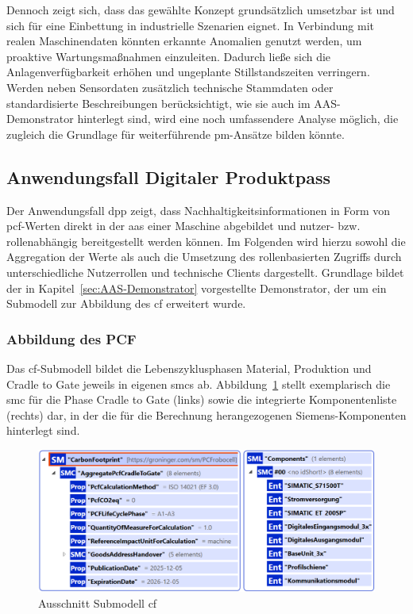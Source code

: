 Dennoch zeigt sich, dass das gewählte Konzept grundsätzlich umsetzbar ist und sich für eine Einbettung in industrielle Szenarien eignet. 
In Verbindung mit realen Maschinendaten könnten erkannte Anomalien genutzt werden, um proaktive Wartungsmaßnahmen einzuleiten. 
Dadurch ließe sich die Anlagenverfügbarkeit erhöhen und ungeplante Stillstandszeiten verringern.
Werden neben Sensordaten zusätzlich technische Stammdaten oder standardisierte Beschreibungen berücksichtigt, wie sie auch im AAS-Demonstrator hinterlegt sind, wird eine noch umfassendere Analyse möglich, die zugleich die Grundlage für weiterführende \acs{pm}-Ansätze bilden könnte.

\newpage
\subsection{Anwendungsfall Digitaler Produktpass}

Der Anwendungsfall \acs{dpp} zeigt, dass Nachhaltigkeitsinformationen in Form von \acs{pcf}-Werten direkt in der \acs{aas} einer Maschine abgebildet und nutzer- bzw. rollenabhängig bereitgestellt werden können.
Im Folgenden wird hierzu sowohl die Aggregation der Werte als auch die Umsetzung des rollenbasierten Zugriffs durch unterschiedliche Nutzerrollen und technische Clients dargestellt.
Grundlage bildet der in Kapitel~\ref{sec:AAS-Demonstrator} vorgestellte Demonstrator, der um ein Submodell zur Abbildung des \acs{cf} erweitert wurde.

\subsubsection{Abbildung des PCF}
Das \acs{cf}-Submodell bildet die Lebenszyklusphasen Material, Produktion und Cradle to Gate jeweils in eigenen \acsp{smc} ab.
Abbildung~\ref{fig:SubmodellCF} stellt exemplarisch die \acs{smc} für die Phase Cradle to Gate (links) sowie die integrierte Komponentenliste (rechts) dar, in der die für die Berechnung herangezogenen Siemens-Komponenten hinterlegt sind.

\vspace{0.5em}
\begin{figure}[htbp]
    \centering
        \includegraphics[width=1\textwidth]{Bilder/ErgebnissePackageExplorer/CarbonFoorprintTest.png}
    \caption{Ausschnitt Submodell \acs{cf}}
    \label{fig:SubmodellCF}
\end{figure}
\vspace{-0.2em}

